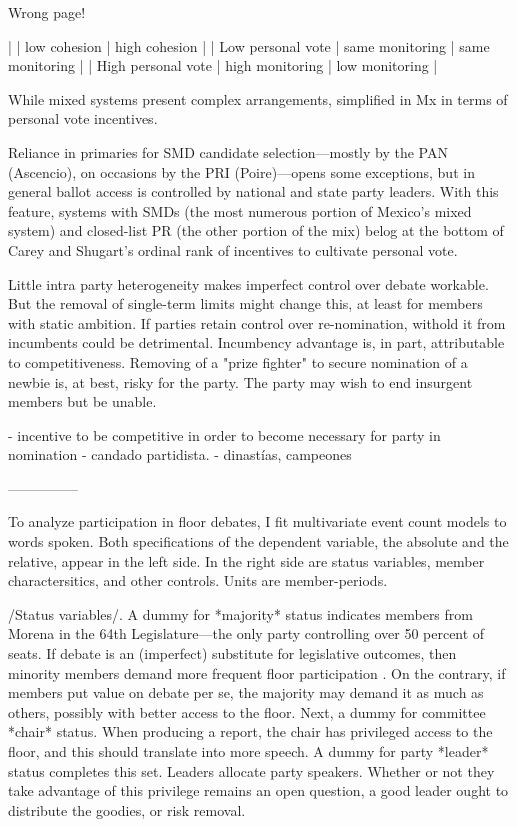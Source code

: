 Wrong page!

|                    | low cohesion    | high cohesion   |
| Low personal vote  | same monitoring | same monitoring |
| High personal vote | high monitoring | low monitoring  |


While mixed systems present complex arrangements, simplified in Mx in terms of personal vote incentives. 

Reliance in primaries for SMD candidate selection---mostly by the PAN (Ascencio), on occasions by the PRI (Poire)---opens some exceptions, but in general ballot access is controlled by national and state party leaders. With this feature, systems with SMDs (the most numerous portion of Mexico's mixed system) and closed-list PR (the other portion of the mix) belog at the bottom of Carey and Shugart's \citeyearpar{carey.shugart.1995} ordinal rank of incentives to cultivate personal vote. 

Little intra party heterogeneity makes imperfect control over debate workable. 
But the removal of single-term limits might change this, at least for members with static ambition. If parties retain control over re-nomination, withold it from incumbents could be detrimental. Incumbency advantage is, in part, attributable to competitiveness. Removing of a "prize fighter" \citep{zallerprizeFighters} to secure nomination of a newbie is, at best, risky for the party. The party may wish to end insurgent members but be unable. 

- incentive to be competitive in order to become necessary for party in nomination
- candado partidista.
- dinastías, campeones





---------------

To analyze participation in floor debates, I fit multivariate event count models to words spoken. Both specifications of the dependent variable, the absolute and the relative, appear in the left side. In the right side are status variables, member charactersitics, and other controls. Units are member-periods. 

/Status variables/. A dummy for *majority* status indicates members from Morena in the 64th Legislature---the only party controlling over 50 percent of seats. If debate is an (imperfect) substitute for legislative outcomes, then minority members demand more frequent floor participation \citep{proksch-slapin2015book}. On the contrary, if members put value on debate per se, the majority may demand it as much as others, possibly with better access to the floor. Next, a dummy for committee *chair* status. When producing a report, the chair has privileged access to the floor, and this should translate into more speech. A dummy for party *leader* status completes this set. Leaders allocate party speakers. Whether or not they take advantage of this privilege remains an open question, a good leader ought to distribute the goodies, or risk removal. 

